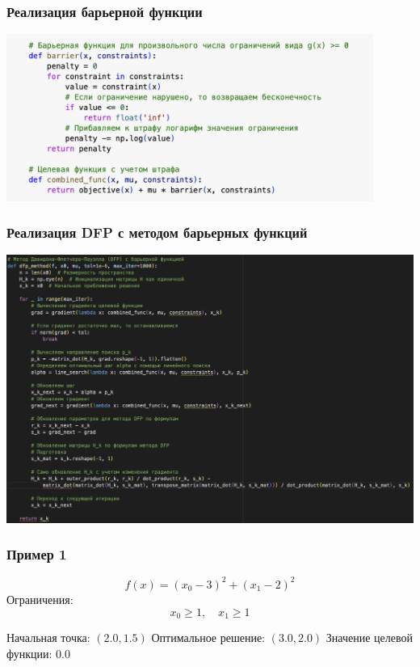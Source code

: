 \documentclass[12pt,pdf,hyperref={unicode}]{beamer}
\begin{document}
\begin{frame}
\frametitle{Реализация барьерной функции}
\begin{center}
    \includegraphics[width=0.9\textwidth]{image3.png}
\end{center}
\end{frame}

\begin{frame}
\frametitle{Реализация DFP с методом барьерных функций}
\begin{center}
    \includegraphics[width=1\textwidth]{image4.png}
\end{center}
\end{frame}

\begin{frame}
\frametitle{Пример 1}
\[
f(x) = (x_0 - 3)^2 + (x_1 - 2)^2
\]
Ограничения: \\
\[
x_0 \geq 1, \quad x_1 \geq 1
\]

Начальная точка: $(2.0, 1.5)$
Оптимальное решение: $(3.0, 2.0)$
Значение целевой функции: $0.0$
\end{frame}
\end{document}
